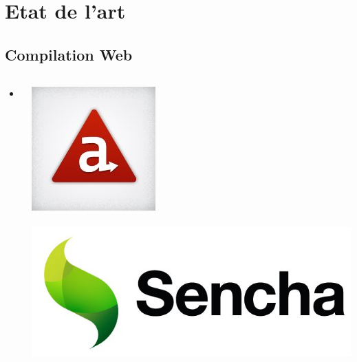 \documentclass{beamer}
\begin{document}
\section{Etat de l'art}

\subsection{Compilation Web}
\begin{frame}
\begin{columns}[c]
  \begin{column}{0.5\textwidth}
    \begin{itemize}
      \item
    \end{itemize}
  \end{column}
  \begin{column}{0.5\textwidth}
    \begin{center}
      \includegraphics[scale=0.3]{titanium}
      \\ ~ \\
      \includegraphics[scale=0.3]{sencha}
    \end{center}
  \end{column}
\end{columns}
\end{frame}
\end{document}
